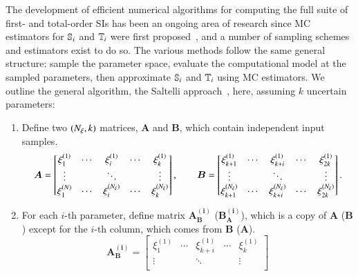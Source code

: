 The development of efficient numerical algorithms for computing the full suite of first- and total-order SIs has been an ongoing area of research since MC estimators for $\S{i}$ and $\T{i}$ were first proposed~\cite{sobol-1993, homma-saltelli-1996, saltelli-2002}, and a number of sampling schemes and estimators exist to do so.
The various methods follow the same general structure: sample the parameter space, evaluate the computational model at the sampled parameters, then approximate $\S{i}$ and $\T{i}$ using MC estimators. 
We outline the general algorithm, the Saltelli approach~\cite{saltelli-etal-2010, saltelli-2002}, here, assuming $k$ uncertain parameters:
\begin{enumerate}
    \item Define two $(\Nxi,k)$ matrices, $\bm{A}$ and $\bm{B}$, which contain independent input samples. 
    \begin{equation}\label{eq:Amatrix}
        \bm{A} = \begin{bmatrix}
        \xi_1^{(1)} & \cdots & \xi_i^{(1)}   & \cdots & \xi_k^{(1)}  \\
        \vdots      &        & \ddots        &        & \vdots       \\
        \xi_1^{(N)} & \cdots & \xi_i^{(\Nxi)}   & \cdots & \xi_k^{(\Nxi)}  \\
        \end{bmatrix} 
        , \quad \quad
        \bm{B} = \begin{bmatrix}
        \xi_{k+1}^{(1)} & \cdots & \xi_{k+i}^{(1)}   & \cdots & \xi_{2k}^{(1)}   \\
        \vdots          &        & \ddots            &        & \vdots           \\
        \xi_{k+1}^{(\Nxi)} & \cdots & \xi_{k+i}^{(\Nxi)}   & \cdots & \xi_{2k}^{(\Nxi)}   \\
        \end{bmatrix} .
    \end{equation}
    \item For each $i$-th parameter, define matrix $\bm{A_B^{(i)}}$ ($\bm{B_A^{(i)}}$), which is a copy of $\bm{A}$ ($\bm{B}$) except for the $i$-th column, which comes from $\bm{B}$ ($\bm{A}$). 
    \begin{equation}\label{eq:ABmatrix}
        \bm{A_B^{(i)}} = \begin{bmatrix}
        \xi_1^{(1)} & \cdots & \xi_{k+i}^{(1)}   & \cdots & \xi_k^{(1)}  \\
        \vdots      &        & \ddots            &        & \vdots       \\

\end{bmatrix}
\end{equation}
\end{enumerate}
